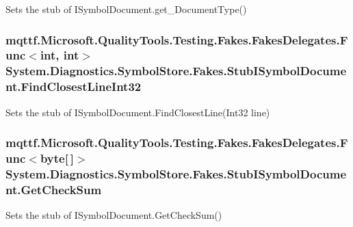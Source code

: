 Sets the stub of I\-Symbol\-Document.\-get\-\_\-\-Document\-Type()

\hypertarget{class_system_1_1_diagnostics_1_1_symbol_store_1_1_fakes_1_1_stub_i_symbol_document_a5a391bf80728f680baabd8cfd32566f0}{
\subsubsection[{Find\-Closest\-Line\-Int32}]{\setlength{\rightskip}{0pt plus 5cm}mqttf.\-Microsoft.\-Quality\-Tools.\-Testing.\-Fakes.\-Fakes\-Delegates.\-Func$<$int, int$>$ System.\-Diagnostics.\-Symbol\-Store.\-Fakes.\-Stub\-I\-Symbol\-Document.\-Find\-Closest\-Line\-Int32}}\label{class_system_1_1_diagnostics_1_1_symbol_store_1_1_fakes_1_1_stub_i_symbol_document_a5a391bf80728f680baabd8cfd32566f0}


Sets the stub of I\-Symbol\-Document.\-Find\-Closest\-Line(\-Int32 line)

\hypertarget{class_system_1_1_diagnostics_1_1_symbol_store_1_1_fakes_1_1_stub_i_symbol_document_a36001ac94bdc146a82e31ea6b24ff8e4}{
\subsubsection[{Get\-Check\-Sum}]{\setlength{\rightskip}{0pt plus 5cm}mqttf.\-Microsoft.\-Quality\-Tools.\-Testing.\-Fakes.\-Fakes\-Delegates.\-Func$<$byte\mbox{[}$\,$\mbox{]}$>$ System.\-Diagnostics.\-Symbol\-Store.\-Fakes.\-Stub\-I\-Symbol\-Document.\-Get\-Check\-Sum}}\label{class_system_1_1_diagnostics_1_1_symbol_store_1_1_fakes_1_1_stub_i_symbol_document_a36001ac94bdc146a82e31ea6b24ff8e4}


Sets the stub of I\-Symbol\-Document.\-Get\-Check\-Sum()

